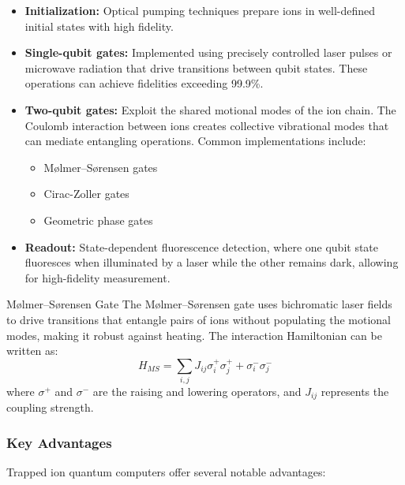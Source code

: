 \begin{itemize}
  \item \textbf{Initialization:} Optical pumping techniques prepare ions in
    well-defined initial states with high fidelity.

  \item \textbf{Single-qubit gates:} Implemented using precisely controlled
    laser pulses or microwave radiation that drive transitions between qubit
    states. These operations can achieve fidelities exceeding 99.9\%.

  \item \textbf{Two-qubit gates:} Exploit the shared motional modes of the
    ion chain. The Coulomb interaction between ions creates collective
    vibrational modes that can mediate entangling operations. Common
    implementations include:
    \begin{itemize}
      \item M\o lmer–S\o rensen gates
      \item Cirac-Zoller gates
      \item Geometric phase gates
    \end{itemize}

  \item \textbf{Readout:} State-dependent fluorescence detection, where one
    qubit state fluoresces when illuminated by a laser while the other
    remains dark, allowing for high-fidelity measurement.
\end{itemize}

\begin{example}{M\o lmer–S\o rensen Gate}
  The M\o lmer–S\o rensen gate uses bichromatic laser fields to drive
  transitions that entangle pairs of ions without populating the motional
  modes, making it robust against heating. The interaction Hamiltonian can be
  written as:
  \begin{equation}
    H_{MS} = \sum_{i,j} J_{ij} \sigma_i^+ \sigma_j^+ + \sigma_i^- \sigma_j^-
  \end{equation}
  where $\sigma^+$ and $\sigma^-$ are the raising and lowering operators, and
  $J_{ij}$ represents the coupling strength.
\end{example}

\subsubsection*{Key Advantages}

Trapped ion quantum computers offer several notable advantages:

